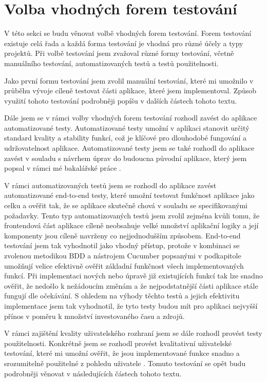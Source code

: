\section{Volba vhodných forem testování}

V této sekci se budu věnovat volbě vhodných forem testování. Forem testování existuje celá řada a každá forma testování je vhodná pro různé účely a typy projektů. Při volbě testování jsem zvažoval různé formy testování, včetně manuálního testování, automatizovaných testů a testů použitelnosti.

Jako první formu testování jsem zvolil manuální testování, které mi umožnilo v průběhu vývoje cíleně testovat části aplikace, které jsem implementoval. Způsob využití tohoto testování podrobněji popíšu v dalších částech tohoto textu.

Dále jsem se v rámci volby vhodných forem testování rozhodl zavést do aplikace automatizované testy. Automatizované testy umožní v aplikaci stanovit určitý standard kvality a stability funkcí, což je klíčové pro dlouhodobé fungování a udržovatelnost aplikace. Automatizované testy jsem se také rozhodl do aplikace zavést v souladu s návrhem úprav do budoucna původní aplikace, který jsem popsal v rámci mé bakalářské práce \cite{Jenicek2024BachelorThesis}.

V rámci automatizovaných testů jsem se rozhodl do aplikace zavést automatizované end-to-end testy, které umožní testovat funkčnost aplikace jako celku a ověřit tak, že se aplikace skutečně chová v souladu se specifikovanými požadavky. Tento typ automatizovaných testů jsem zvolil zejména kvůli tomu, že frontendová část aplikace cíleně neobsahuje velké množství aplikační logiky a její komponenty jsou cíleně navrženy co nejjednodušším způsobem. End-to-end testování jsem tak vyhodnotil jako vhodný přístup, protože v kombinaci se zvolenou metodikou BDD a nástrojem Cucumber popsanými v podkapitole  umožňují velice efektivně ověřit základní funkčnost všech implementovaných funkcí. Při implementaci nových nebo úpravě již existujících funkcí tak lze snadno ověřit, že nedošlo k nežádoucím změnám a že nejpodstatnější části aplikace stále fungují dle očekávání. S ohledem na výhody těchto testů a jejich efektivitu implementace jsem tak vyhodnotil, že tyto testy budou mít pro aplikaci nejvyšší přínos v poměru k množství investovaného času a zdrojů.

V rámci zajištění kvality uživatelského rozhraní jsem se dále rozhodl provést testy použitelnosti. Konkrétně jsem se rozhodl provést kvalitativní uživatelské testování, které mi umožní ověřit, že jsou implementované funkce snadno a srozumitelně použitelné z pohledu uživatele \cite{NURUserInterfaceTesting}. Tomuto testování se opět budu podrobněji věnovat v následujících částech tohoto textu.

